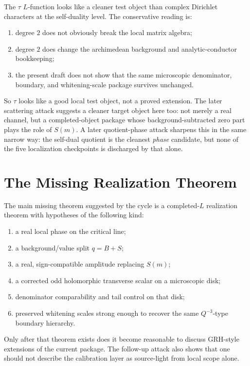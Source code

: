 \documentclass[11pt]{article}
\begin{document}
The \(\tau\) \(L\)-function looks like a cleaner test object than complex
Dirichlet characters at the self-duality level. The conservative reading is:

\begin{enumerate}
\item degree \(2\) does not obviously break the local matrix algebra;
\item degree \(2\) does change the archimedean background and analytic-conductor
bookkeeping;
\item the present draft does not show that the same microscopic denominator,
boundary, and whitening-scale package survives unchanged.
\end{enumerate}

So \(\tau\) looks like a good local test object, not a proved extension. The
later scattering attack suggests a cleaner target object here too: not merely a
real channel, but a completed-object package whose background-subtracted zero
part plays the role of \(S(m)\). A later quotient-phase attack sharpens this in
the same narrow way: the self-dual quotient is the cleanest \emph{phase}
candidate, but none of the five localization checkpoints is discharged by that
alone.

\section{The Missing Realization Theorem}

The main missing theorem suggested by the cycle is a completed-\(L\)
realization theorem with hypotheses of the following kind:

\begin{enumerate}
\item a real local phase on the critical line;
\item a background/value split \(q=B+S\);
\item a real, sign-compatible amplitude replacing \(S(m)\);
\item a corrected odd holomorphic transverse scalar on a microscopic disk;
\item denominator comparability and tail control on that disk;
\item preserved whitening scales strong enough to recover the same
\(Q^{-3}\)-type boundary hierarchy.
\end{enumerate}

Only after that theorem exists does it become reasonable to discuss GRH-style
extensions of the current package. The follow-up attack also shows that one
should not describe the calibration layer as source-light from local scope
alone.
\end{document}
